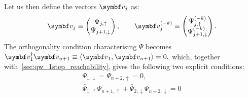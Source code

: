Let us then define the vectors $\bs v_j$ as:
\begin{equation}
    \bs v_j \equiv \begin{pmatrix}
        \Psi_{j,\uparrow} \\ \Psi_{j+1,\downarrow}
    \end{pmatrix},
    \qquad
    \bs v_j^{(-k)} \equiv \begin{pmatrix}
        \Psi^{(-k)}_{j,\uparrow} \\ \Psi^{(-k)}_{j+1,\downarrow}
    \end{pmatrix}.
\end{equation}
The orthogonality condition characterising $\Psi$ becomes
$
    \bs v_1^\dagger \bs v_{n+1} \equiv \langle \bs v_1, \bs v_{n+1}\rangle = 0,
$
which, together with~\cref{sec:qw_1step_reachability}, gives the following two explicit conditions:
\begin{subequations}
    \label{eq:qw_both_2ndstep_conditions}
    \begin{align}
        \Psi_{1,\downarrow} = \Psi_{n+2,\uparrow} = 0,
 		\label{eq:qw_vanishing_endpoints_after_2steps}\\
        \bar\Psi_{1,\uparrow} \Psi_{n+1,\uparrow} + 
        \bar\Psi_{2,\downarrow} \Psi_{n+2,\downarrow} = 0
 		\label{eq:qw_1st_orthogonality_condition}
    \end{align}
\end{subequations}

